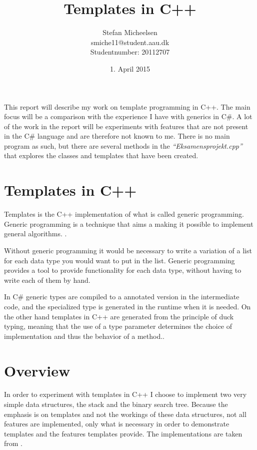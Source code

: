 


\title{Templates in C++ }
\author{Stefan Micheelsen \\smiche11@student.aau.dk \\Studentnumber: 20112707}
\date{1. April 2015}

\newcommand{\file}[1]
{
	\textit{\color{gray} ``#1''}
}





\maketitle

This report will describe my work on template programming in C++.
The main focus will be a comparison with the experience I have with generics in C\#.
A lot of the work in the report will be experiments with features that are not present in the C\# language and are therefore not known to me.
There is no main program as such, but there are several methods in the \file{Eksamensprojekt.cpp} that explores the classes and templates that have been created.


\section{Templates in C++}
Templates is the C++ implementation of what is called generic programming.
Generic programming is a technique that aims a making it possible to implement general algorithms. \cite[p.~700]{stroustrup2013c++}.

Without generic programming it would be necessary to write a variation of a list for each data type you would want to put in the list.
Generic programming provides a tool to provide functionality for each data type, without having to write each of them by hand.

In C\# generic types are compiled to a annotated version in the intermediate code, and the specialized type is generated in the runtime when it is needed\cite{genericruntime}.
On the other hand templates in C++ are generated from the principle of duck typing, meaning that the use of a type parameter determines the choice of implementation and thus the behavior of a method.\cite[p.~700]{stroustrup2013c++}.

\section{Overview}
In order to experiment with templates in C++ I choose to implement two very simple data structures, the stack and the binary search tree.
Because the emphasis is on templates and not the workings of these data structures, not all features are implemented, only what is necessary in order to demonstrate templates and the features templates provide.
The implementations are taken from \citet{algo}.

